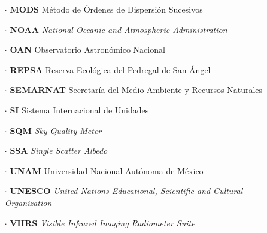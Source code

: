 \begin{itemize}
\item[$\cdot$] \textbf{MODS} Método de Órdenes de Dispersión Sucesivos

\item[$\cdot$] \textbf{NOAA} \textit{National Oceanic and Atmospheric Administration}

\item[$\cdot$] \textbf{OAN} Observatorio Astronómico Nacional

\item[$\cdot$] \textbf{REPSA} Reserva Ecológica del Pedregal de San Ángel

\item[$\cdot$] \textbf{SEMARNAT} Secretaría del Medio Ambiente y Recursos Naturales

\item[$\cdot$] \textbf{SI} Sistema Internacional de Unidades

\item[$\cdot$] \textbf{SQM} \textit{Sky Quality Meter}

\item[$\cdot$] \textbf{SSA} \textit{Single Scatter Albedo}

\item[$\cdot$] \textbf{UNAM} Universidad Nacional Autónoma de México

\item[$\cdot$] \textbf{UNESCO} \textit{United Nations Educational, Scientific and Cultural Organization}

\item[$\cdot$] \textbf{VIIRS} \textit{Visible Infrared Imaging Radiometer Suite}
			
\end{itemize}